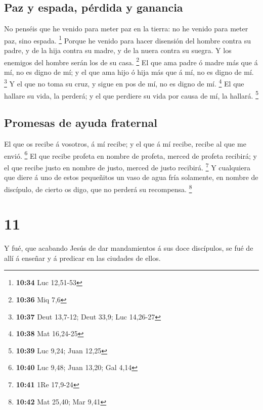 \hypertarget{paz-y-espada-puxe9rdida-y-ganancia}{%
\subsection{Paz y espada, pérdida y
ganancia}\label{paz-y-espada-puxe9rdida-y-ganancia}}

 No penséis que he venido para meter paz en la tierra: no
he venido para meter paz, sino espada. \footnote{\textbf{10:34} Luc
  12,51-53}  Porque he venido para hacer disensión del
hombre contra su padre, y de la hija contra su madre, y de la nuera
contra su suegra.  Y los enemigos del hombre serán los de
su casa. \footnote{\textbf{10:36} Miq 7,6}  El que ama
padre ó madre más que á mí, no es digno de mí; y el que ama hijo ó hija
más que á mí, no es digno de mí. \footnote{\textbf{10:37} Deut 13,7-12;
  Deut 33,9; Luc 14,26-27}  Y el que no toma su cruz, y
sigue en pos de mí, no es digno de mí. \footnote{\textbf{10:38} Mat
  16,24-25}  El que hallare su vida, la perderá; y el que
perdiere su vida por causa de mí, la hallará. \footnote{\textbf{10:39}
  Luc 9,24; Juan 12,25}

\hypertarget{promesas-de-ayuda-fraternal}{%
\subsection{Promesas de ayuda
fraternal}\label{promesas-de-ayuda-fraternal}}

 El que os recibe á vosotros, á mí recibe; y el que á mí
recibe, recibe al que me envió. \footnote{\textbf{10:40} Luc 9,48; Juan
  13,20; Gal 4,14}  El que recibe profeta en nombre de
profeta, merced de profeta recibirá; y el que recibe justo en nombre de
justo, merced de justo recibirá. \footnote{\textbf{10:41} 1Re 17,9-24}
 Y cualquiera que diere á uno de estos pequeñitos un vaso
de agua fría solamente, en nombre de discípulo, de cierto os digo, que
no perderá su recompensa. \footnote{\textbf{10:42} Mat 25,40; Mar 9,41}

\hypertarget{section-10}{%
\section{11}\label{section-10}}

 Y fué, que acabando Jesús de dar mandamientos á sus doce
discípulos, se fué de allí á enseñar y á predicar en las ciudades de
ellos.

